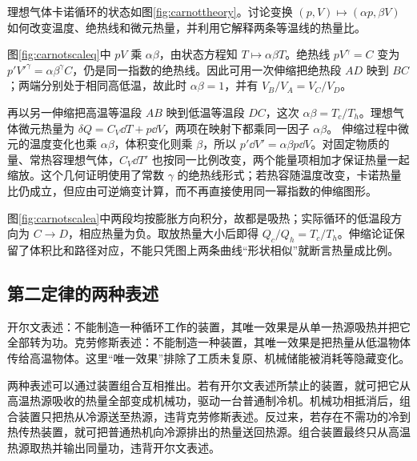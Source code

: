 \begin{example}[用图形伸缩理解卡诺热量比]\label{ex:carnotscale}
理想气体卡诺循环的状态如图\ref{fig:carnottheory}。讨论变换 $(p,V)\mapsto(\alpha p,\beta V)$ 如何改变温度、绝热线和微元热量，并利用它解释两条等温线的热量比。
\end{example}
\begin{solution}
图\ref{fig:carnotscaleq}中 $pV$ 乘 $\alpha\beta$，由状态方程知 $T\mapsto\alpha\beta T$。绝热线 $pV^\gamma=C$ 变为 $p'V'^\gamma=\alpha\beta^\gamma C$，仍是同一指数的绝热线。因此可用一次伸缩把绝热段 $AD$ 映到 $BC$；两端分别处于相同高低温，故此时 $\alpha\beta=1$，并有 $V_B/V_A=V_C/V_D$。

再以另一伸缩把高温等温段 $AB$ 映到低温等温段 $DC$，这次 $\alpha\beta=T_c/T_h$。理想气体微元热量为 $\delta Q=C_V\dd T+p\dd V$，两项在映射下都乘同一因子 $\alpha\beta$。
伸缩过程中微元的温度变化也乘 $\alpha\beta$，体积变化则乘 $\beta$，所以 $p'\dd V'=\alpha\beta p\dd V$。对固定物质的量、常热容理想气体，$C_V\dd T'$ 也按同一比例改变，两个能量项相加才保证热量一起缩放。这个几何证明使用了常数 $\gamma$ 的绝热线形式；若热容随温度改变，卡诺热量比仍成立，但应由可逆熵变计算，而不再直接使用同一幂指数的伸缩图形。

图\ref{fig:carnotscalea}中两段均按膨胀方向积分，故都是吸热；实际循环的低温段方向为 $C\to D$，相应热量为负。取放热量大小后即得 $Q_c/Q_h=T_c/T_h$。伸缩论证保留了体积比和路径对应，不能只凭图上两条曲线“形状相似”就断言热量成比例。
\end{solution}

\subsection{第二定律的两种表述}
\label{th:secondlaw}
开尔文表述：不能制造一种循环工作的装置，其唯一效果是从单一热源吸热并把它全部转为功。克劳修斯表述：不能制造一种装置，其唯一效果是把热量从低温物体传给高温物体。这里“唯一效果”排除了工质未复原、机械储能被消耗等隐藏变化。

两种表述可以通过装置组合互相推出。若有开尔文表述所禁止的装置，就可把它从高温热源吸收的热量全部变成机械功，驱动一台普通制冷机。机械功相抵消后，组合装置只把热从冷源送至热源，违背克劳修斯表述。反过来，若存在不需功的冷到热传热装置，就可把普通热机向冷源排出的热量送回热源。组合装置最终只从高温热源取热并输出同量功，违背开尔文表述。

